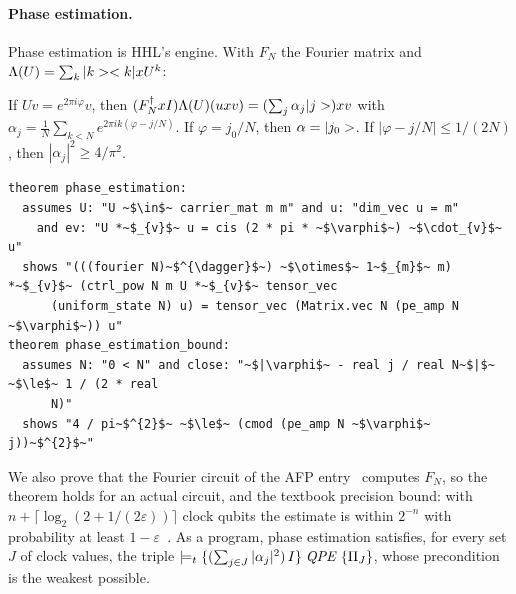 \paragraph{Phase estimation.} Phase estimation is HHL's engine. With $F_N$ the Fourier matrix and
$\Lambda(U)=\sum_k|k>< k|x U^k$:

\begin{theorem}\label{thm:qpe}
If $Uv=e^{2\pi i\varphi}v$, then $(F_N^\dagger x I)\Lambda(U)(ux v)=(\sum_j\alpha_j|j>)x v$ with $\alpha_j=\frac1N\sum_{k<N}e^{2\pi ik(\varphi-j/N)}$. If $\varphi=j_0/N$, then
$\alpha=|j_0>$. If $|\varphi-j/N|\le1/(2N)$, then $|\alpha_j|^2\ge4/\pi^2$.
\end{theorem}

\begin{lstlisting}[float=tp,caption={Phase estimation and the $4/\pi^2$ bound},label={lst:qpe}]
theorem phase_estimation:
  assumes U: "U ~$\in$~ carrier_mat m m" and u: "dim_vec u = m"
    and ev: "U *~$_{v}$~ u = cis (2 * pi * ~$\varphi$~) ~$\cdot_{v}$~ u"
  shows "(((fourier N)~$^{\dagger}$~) ~$\otimes$~ 1~$_{m}$~ m) *~$_{v}$~ (ctrl_pow N m U *~$_{v}$~ tensor_vec
      (uniform_state N) u) = tensor_vec (Matrix.vec N (pe_amp N ~$\varphi$~)) u"
theorem phase_estimation_bound:
  assumes N: "0 < N" and close: "~$|\varphi$~ - real j / real N~$|$~ ~$\le$~ 1 / (2 * real
      N)"
  shows "4 / pi~$^{2}$~ ~$\le$~ (cmod (pe_amp N ~$\varphi$~ j))~$^{2}$~"
\end{lstlisting}

We also prove that the Fourier circuit of the AFP entry~\cite{manrique2025qft} computes $F_N$, so
the theorem holds for an actual circuit, and the textbook precision bound: with
$n+\lceil\log_2(2+1/(2\varepsilon))\rceil$ clock qubits the estimate is within $2^{-n}$ with probability
at least $1-\varepsilon$~\cite{nielsenchuang}. As a program, phase estimation satisfies, for every set
$J$ of clock values, the triple $\models_{t}\{(\sum_{j\in J}|\alpha_j|^2)\,I\}\;\mathit{QPE}\;\{\Pi_J\}$, whose
precondition is the weakest possible.

